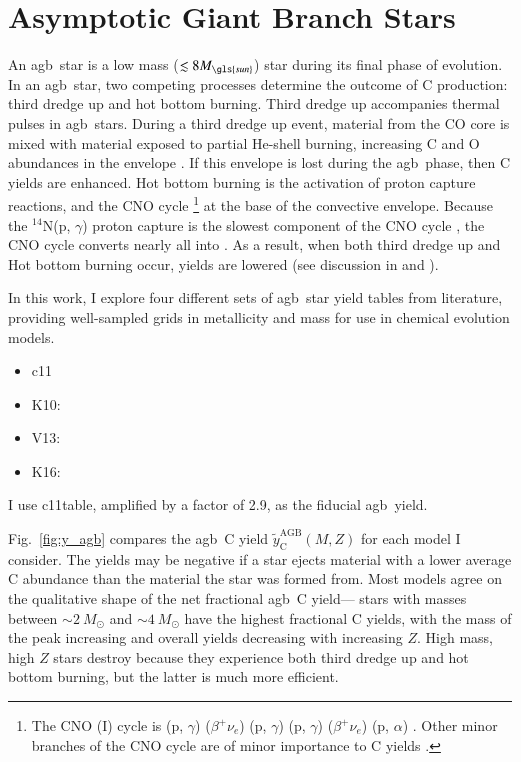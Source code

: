 \documentclass[12pt,oneside,letterpaper]{report}
\newcommand{\agb}{\gls{agb}}
\newcommand{\cxi}{\gls{c11}}
\newcommand{\sun}{\gls{sun}}
\newcommand{\alp}{$\alpha$}
\newcommand{\about}[1]{${\sim} #1$}
\begin{document}
\section{Asymptotic Giant Branch Stars}\label{sec:agb}


An \agb\ star is a low mass ($\lesssim 8 M_{\sun}$) star during its final phase of evolution.  In an \agb\ star, two competing processes determine the outcome of C production: third dredge up and hot bottom burning.  Third dredge up accompanies thermal pulses in \agb\ stars. During a third dredge up event, material from the CO core is mixed with material exposed to partial He-shell burning, increasing C and O abundances in the envelope \citep{KL14}. If this envelope is lost during the \agb\ phase, then C yields are enhanced.
Hot bottom burning is the activation of proton capture reactions, and the CNO cycle%
\footnote{The CNO (I) cycle is
(p, $\gamma$)
($\beta^+ \nu_e$)
(p, $\gamma$)
(p, $\gamma$)
($\beta^{+}\nu_e$)
(p, \alp)
.
 Other minor branches of the CNO cycle are of minor importance to C yields
 \citep{solar-fusion}.
}
at the base of the convective envelope. Because the $^{14}$N(p, $\gamma$) proton capture is the slowest component of the CNO cycle \citep{solar-fusion}, the CNO cycle converts nearly all  into .
As a result, when both third dredge up and Hot bottom burning occur,  yields are lowered (see discussion in \citealt{james+23} and \citealt{ventura+13}).

In this work, I explore four different sets of \agb\ star yield tables from literature, providing well-sampled grids in metallicity and mass for use in chemical evolution models. 
\begin{itemize}
    \item \cxi \citet{cristallo+11, cristallo+15}
    \item K10: \citet{karakas10}
    \item V13: \citet{ventura+13,ventura+14,ventura+18, ventura+20}
    \item K16: \citet{KL16} \citet{karakas+18}
\end{itemize}
I use \cxi table, amplified by a factor of 2.9, as the fiducial \agb\ yield.

Fig.~\ref{fig:y_agb} compares the \agb\ C yield $\tilde{y}_\text{C}^\text{AGB}(M, Z)$ for each model I consider. 
The yields may be negative if a star ejects material with a lower average C abundance than the material the star was formed from.
Most models agree on the qualitative shape of the net fractional \agb\ C yield---%
stars with masses between \about{2~M_\odot} and \about{4~M_\odot} have the highest fractional C yields, with the mass of the peak increasing and overall yields decreasing with increasing $Z$.  High mass, high $Z$ stars destroy  because they experience both third dredge up and hot bottom burning, but the latter is much more efficient.
\end{document}
